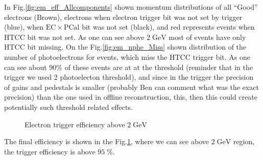 In Fig.\ref{fig:em_eff_Allcomponents} shown momentum distributions of all ``Good'' electrons (Brown), electrons when electron trigger bit was not set by trigger (blue), when $\mathrm{EC}\times \mathrm{PCal}$ bit was not set (black), and red represents events when HTCC bit was not set. As one can see above $\mathrm{2\; GeV}$ most of events have only HTCC bit missing. On the Fig.\ref{fig:em_nphe_Miss} shown distribution of the number of photoelectrons for events, which miss the HTCC trigger bit. As one can see about $\mathrm{90\%}$ of these events are at at the threshold (reminder that in the trigger we used 2 photoelecton threshold), and since in the trigger the precision of gains and pedestals is smaller ({\color{Red}probably Ben can comment what was the exact precision}) than the one used in offline reconstruction, this, then this could create potentially such threshold related effects.
\begin{figure}[!htb]
 \centering
 \caption{Electron trigger efficiency above $\mathrm{2\;GeV}$}
 \label{fig:em_eff}
\end{figure}
The final efficiency is shown in the Fig.\ref{fig:em_eff}, where we can see above $\mathrm{2\;GeV}$ region, the trigger efficiency is above $\mathrm{95\; \%}$.
